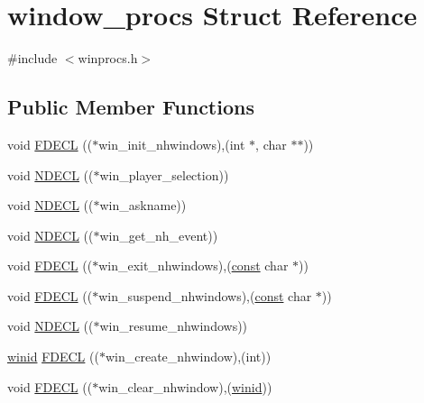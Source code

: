 \hypertarget{structwindow__procs}{\section{window\+\_\+procs Struct Reference}
\label{structwindow__procs}
}


{\ttfamily \#include $<$winprocs.\+h$>$}

\subsection*{Public Member Functions}
\begin{DoxyCompactItemize}
\item 
void \hyperlink{structwindow__procs_ac7b6b1558340b68e148a6f627834d6e1}{F\+D\+E\+C\+L} (($\ast$win\+\_\+init\+\_\+nhwindows),(int $\ast$, char $\ast$$\ast$))
\item 
void \hyperlink{structwindow__procs_aac696dab5b3f3db5a76f8883d80e7e77}{N\+D\+E\+C\+L} (($\ast$win\+\_\+player\+\_\+selection))
\item 
void \hyperlink{structwindow__procs_a0f5592574203004c308c351aee8f662e}{N\+D\+E\+C\+L} (($\ast$win\+\_\+askname))
\item 
void \hyperlink{structwindow__procs_af8d45a6803ab5581c17ec24bc1fc38d9}{N\+D\+E\+C\+L} (($\ast$win\+\_\+get\+\_\+nh\+\_\+event))
\item 
void \hyperlink{structwindow__procs_af0b8c17fa625f1fa507f71fddb970984}{F\+D\+E\+C\+L} (($\ast$win\+\_\+exit\+\_\+nhwindows),(\hyperlink{tradstdc_8h_a2c212835823e3c54a8ab6d95c652660e}{const} char $\ast$))
\item 
void \hyperlink{structwindow__procs_a6890dae7b7e75f349a2293df58f67871}{F\+D\+E\+C\+L} (($\ast$win\+\_\+suspend\+\_\+nhwindows),(\hyperlink{tradstdc_8h_a2c212835823e3c54a8ab6d95c652660e}{const} char $\ast$))
\item 
void \hyperlink{structwindow__procs_a2320169146c1b6139b04aed96838db04}{N\+D\+E\+C\+L} (($\ast$win\+\_\+resume\+\_\+nhwindows))
\item 
\hyperlink{wintype_8h_adc2de956a3f084b1691cf080e1d1412b}{winid} \hyperlink{structwindow__procs_ac81663a9c0681eb0f58e930b3e572bdc}{F\+D\+E\+C\+L} (($\ast$win\+\_\+create\+\_\+nhwindow),(int))
\item 
void \hyperlink{structwindow__procs_a43991d264aa433de5c7e534f4718caf0}{F\+D\+E\+C\+L} (($\ast$win\+\_\+clear\+\_\+nhwindow),(\hyperlink{wintype_8h_adc2de956a3f084b1691cf080e1d1412b}{winid}))
\item 
$$
\end{DoxyCompactItemize}
